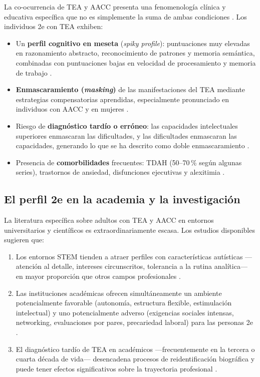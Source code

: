 \documentclass[12pt, a4paper]{article}
\begin{document}
La co-ocurrencia de TEA y AACC presenta una fenomenología clínica y educativa
específica que no es simplemente la suma de ambas condiciones
\parencite{burgersveltmeijer2011}. Los individuos 2e con TEA exhiben:

\begin{itemize}[leftmargin=*, itemsep=0pt]
    \item Un \textbf{perfil cognitivo en meseta} (\textit{spiky profile}): puntuaciones
    muy elevadas en razonamiento abstracto, reconocimiento de patrones y memoria
    semántica, combinadas con puntuaciones bajas en velocidad de procesamiento y
    memoria de trabajo \parencite{assouline2012}.
    \item \textbf{Enmascaramiento (\textit{masking})} de las manifestaciones del TEA
    mediante estrategias compensatorias aprendidas, especialmente pronunciado en
    individuos con AACC y en mujeres \parencite{hull2017}.
    \item Riesgo de \textbf{diagnóstico tardío o erróneo}: las capacidades
    intelectuales superiores enmascaran las dificultades, y las dificultades
    enmascaran las capacidades, generando lo que se ha descrito como doble
    enmascaramiento \parencite{foleynicpon2017}.
    \item Presencia de \textbf{comorbilidades} frecuentes: TDAH (50--70\,\% según
    algunas series), trastornos de ansiedad, disfunciones ejecutivas y
    alexitimia \parencite{deprey2011}.
\end{itemize}

\subsection{El perfil 2e en la academia y la investigación}

La literatura específica sobre adultos con TEA y AACC en entornos universitarios y
científicos es extraordinariamente escasa. Los estudios disponibles sugieren que:

\begin{enumerate}[leftmargin=*, itemsep=2pt]
    \item Los entornos STEM tienden a atraer perfiles con características autísticas
    —atención al detalle, intereses circunscritos, tolerancia a la rutina analítica—
    en mayor proporción que otros campos profesionales \parencite{baron-cohen2001}.
    \item Las instituciones académicas ofrecen simultáneamente un ambiente
    potencialmente favorable (autonomía, estructura flexible, estimulación intelectual)
    y uno potencialmente adverso (exigencias sociales intensas, networking, evaluaciones
    por pares, precariedad laboral) para las personas 2e \parencite{price2022}.
    \item El diagnóstico tardío de TEA en académicos —frecuentemente en la tercera
    o cuarta década de vida— desencadena procesos de reidentificación biográfica y
    puede tener efectos significativos sobre la trayectoria profesional
    \parencite{raymaker2020}.
\end{enumerate}
\end{document}
